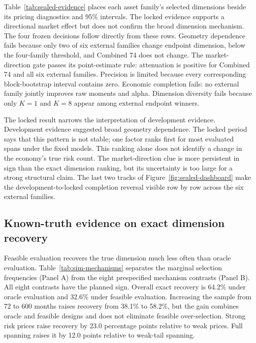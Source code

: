 Table~\ref{tab:sealed-evidence} places each asset family's selected dimensions beside its pricing diagnostics and 95\% intervals. The locked evidence supports a directional market effect but does not confirm the broad dimension mechanism. The four frozen decisions follow directly from these rows. Geometry dependence fails because only two of six external families change endpoint dimension, below the four-family threshold, and Combined 74 does not change. The market-direction gate passes its point-estimate rule: attenuation is positive for Combined 74 and all six external families. Precision is limited because every corresponding block-bootstrap interval contains zero. Economic completion fails: no external family jointly improves raw moments and alpha. Dimension diversity fails because only $K=1$ and $K=8$ appear among external endpoint winners.





The locked result narrows the interpretation of development evidence. Development evidence suggested broad geometry dependence. The locked period says that this pattern is not stable; one factor ranks first for most evaluated spans under the fixed models. This ranking alone does not identify a change in the economy's true risk count. The market-direction clue is more persistent in sign than the exact dimension ranking, but its uncertainty is too large for a strong structural claim. The last two tracks of Figure~\ref{fig:sealed-dashboard} make the development-to-locked completion reversal visible row by row across the six external families.

\subsection{Known-truth evidence on exact dimension recovery}

Feasible evaluation recovers the true dimension much less often than oracle evaluation. Table~\ref{tab:sim-mechanisms} separates the marginal selection frequencies (Panel A) from the eight prespecified mechanism contrasts (Panel B). All eight contrasts have the planned sign. Overall exact recovery is 64.2\% under oracle evaluation and 32.6\% under feasible evaluation. Increasing the sample from 72 to 600 months raises recovery from 38.1\% to 58.2\%, but the gain combines oracle and feasible designs and does not eliminate feasible over-selection. Strong risk prices raise recovery by 23.0 percentage points relative to weak prices. Full spanning raises it by 12.0 points relative to weak-tail spanning.

